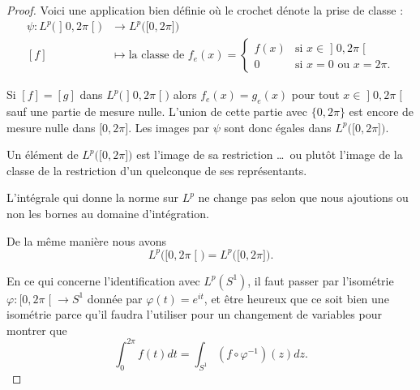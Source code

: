 \begin{proof}
	Voici une application bien définie où le crochet dénote la prise de classe :
	\begin{equation}
		\begin{aligned}
			\psi\colon L^p\big(\mathopen] 0 , 2\pi \mathclose[\big) & \to L^p\big(\mathopen[ 0 , 2\pi \mathclose]\big)               \\
			[f]                                                     & \mapsto \text{la classe de } f_e(x)=\begin{cases}
				f(x) & \text{si } x\in\mathopen] 0 , 2\pi \mathclose[ \\
				0    & \text{si } x=0\text{ ou } x=2\pi.
			\end{cases}
		\end{aligned}
	\end{equation}
	\begin{subproof}
		\item[Injective]
		Si \( [f]=[g]\) dans \( L^p\big(\mathopen] 0 , 2\pi \mathclose[\big)\) alors \( f_e(x)=g_e(x)\) pour tout \( x\in \mathopen] 0 , 2\pi \mathclose[ \) sauf une partie de mesure nulle. L'union de cette partie avec \( \{ 0,2\pi \}\) est encore de mesure nulle dans \( \mathopen[ 0 , 2\pi \mathclose]\). Les images par \( \psi\) sont donc égales dans \( L^p\big( \mathopen[ 0 , 2\pi \mathclose] \big)\).
		\item[Surjective]
		Un élément de \( L^p\big( \mathopen[ 0 , 2\pi \mathclose] \big)\) est l'image de sa restriction \ldots\ ou plutôt l'image de la classe de la restriction d'un quelconque de ses représentants.
		\item[Isométrie]
		L'intégrale qui donne la norme sur \( L^p\) ne change pas selon que nous ajoutions ou non les bornes au domaine d'intégration.
	\end{subproof}

	De la même manière nous avons
	\begin{equation}
		L^p\big( \mathopen[ 0 , 2\pi \mathclose[ \big)=L^p\big( \mathopen[ 0 , 2\pi \mathclose] \big).
	\end{equation}

	En ce qui concerne l'identification avec \( L^p(S^1)\), il faut passer par l'isométrie \( \varphi\colon \mathopen[ 0 , 2\pi \mathclose[\to S^1\) donnée par \( \varphi(t)= e^{it}\), et être heureux que ce soit bien une isométrie parce qu'il faudra l'utiliser pour un changement de variables pour montrer que
	\begin{equation}
		\int_0^{2\pi}f(t)dt=\int_{S^1}(f\circ\varphi^{-1})(z)dz.
	\end{equation}
\end{proof}

